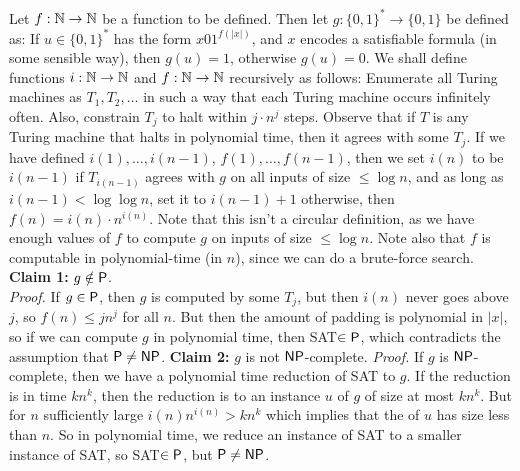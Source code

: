 \documentclass{article}
\begin{document}
\proof Let $f : \mathbb{N} \to \mathbb{N}$ be a function to be defined. Then let $g : \{0,1\}^{*} \to \{0,1\}$ be defined as: \gap 
If $u \in \{0,1\}^{*}$ has the form $x01^{f(|x|)}$, and $x$ encodes a satisfiable formula (in some sensible way), then $g(u)=1$, otherwise $g(u)=0$. \gap 
We shall define functions $i: \mathbb{N} \to \mathbb{N}$ and $f: \mathbb{N} \to \mathbb{N}$ recursively as follows: Enumerate all Turing machines as $T_{1},T_{2},\dots$ in such a way that each Turing machine occurs infinitely often. Also, constrain $T_{j}$ to halt within $j \cdot n^{j}$ steps. \gap 
Observe that if $T$ is any Turing machine that halts in polynomial time, then it agrees with some $T_{j}$. If we have defined $i(1), \dots, i(n-1)$, $f(1),\dots, f(n-1)$, then we set $i(n)$ to be $i(n-1)$ if $T_{i(n-1)}$ agrees with $g$ on all inputs of size $\leq \log n$, and as long as $i(n-1)< \log \log n$, set it to $i(n-1)+1$ otherwise, then $f(n)=i(n) \cdot n^{i(n)}$. \gap
Note that this isn't a circular definition, as we have enough values of $f$ to compute $g$ on inputs of size $\leq \log n$. Note also that $f$ is computable in polynomial-time (in $n$), since we can do a brute-force search.\gap 
\textbf{Claim 1:} $g \notin \mathsf{P}$. \\ 
\textit{Proof.} If $g \in \mathsf{P}$, then $g$ is computed by some $T_{j}$, but then $i(n)$ never goes above $j$, so $f(n) \leq j n^{j}$ for all $n$. But then the amount of padding is polynomial in $|x|$, so if we can compute $g$ in polynomial time, then SAT$\in \mathsf{P}$, which contradicts the assumption that $\mathsf{P} \neq \mathsf{NP}$.\gap 
\textbf{Claim 2:} $g$ is not $\mathsf{NP}$-complete.
\textit{Proof.} If $g$ is $\mathsf{NP}$-complete, then we have a polynomial time reduction of SAT to $g$. If the reduction is in time $k n^{k}$, then the reduction is to an instance $u$ of $g$ of size at most $kn^{k}$. But for $n$ sufficiently large $i(n) n^{i(n)} > k n^{k}$ which implies that the  of $u$ has size less than $n$. So in polynomial time, we reduce an instance of SAT to a smaller instance of SAT, so SAT$\in \mathsf{P}$, but $\mathsf{P} \neq \mathsf{NP}$. 
\endproof 
\end{document}
